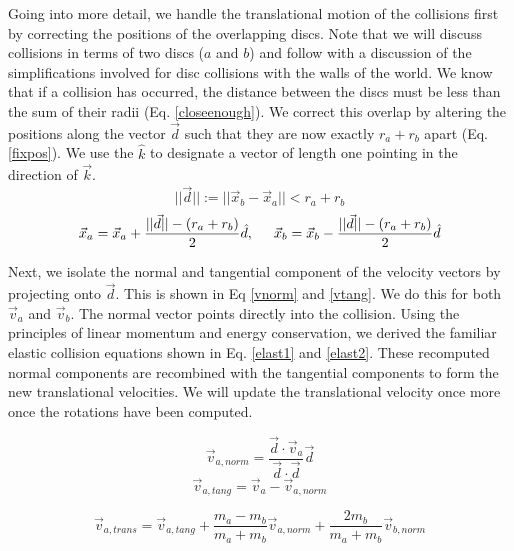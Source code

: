 \documentclass[pdftext,twoside,10pt]{article}
\begin{document}
Going into more detail, we handle the translational motion of the collisions first by correcting the positions of the overlapping discs. Note that we will discuss collisions in terms of two discs ($a$ and $b$) and follow with a discussion of the simplifications involved for disc collisions with the walls of the world. We know that if a collision has occurred, the distance between the discs must be less than the sum of their radii (Eq. \ref{closeenough}). We correct this overlap by altering the positions along the vector $\vec{d}$ such that they are now exactly $r_a + r_b$ apart (Eq. \ref{fixpos}). We use the $\hat{k}$ to designate a vector of length one pointing in the direction of $\vec{k}$.
\begin{equation}
 ||\vec{d}|| := ||\vec{x}_b - \vec{x}_a || < r_a + r_b
 \label{closeenough}
\end{equation}
\begin{equation}
 \vec{x}_a = \vec{x}_a + \frac{||\vec{d}|| - (r_a + r_b)}{2}\hat{d}, \hspace{.5cm}
 \vec{x}_b = \vec{x}_b - \frac{||\vec{d}|| - (r_a + r_b)}{2}\hat{d}
 \label{fixpos}
\end{equation}

Next, we isolate the normal and tangential component of the velocity vectors by projecting onto $\vec{d}$. This is shown in Eq \ref{vnorm} and \ref{vtang}. We do this for both $\vec{v}_a$ and $\vec{v}_b$. The normal vector points directly into the collision. Using the principles of linear momentum and energy conservation, we derived the familiar elastic collision equations shown in Eq. \ref{elast1} and \ref{elast2}. These recomputed normal components are recombined with the tangential components to form the new translational velocities. We will update the translational velocity once more once the rotations have been computed.

\begin{equation}
\vec{v}_{a,norm} = \frac{\vec{d} \cdot \vec{v}_a}{\vec{d} \cdot \vec{d}} \vec{d}
 \label{vnorm}
\end{equation}
\begin{equation}
\vec{v}_{a,tang} = \vec{v}_{a} - \vec{v}_{a,norm} 
 \label{vtang}
\end{equation}

\begin{equation}
\vec{v}_{a, trans} = \vec{v}_{a,tang} + \frac{m_a - m_b}{m_a+m_b}\vec{v}_{a,norm} +  \frac{2m_b}{m_a+m_b}\vec{v}_{b,norm}
 \label{elast1}
\end{equation}
\end{document}

